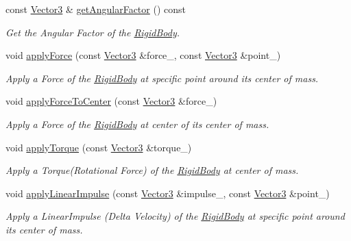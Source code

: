 \begin{DoxyCompactItemize}
const \hyperlink{class_i_dream_sky_1_1_vector3}{Vector3} \& \hyperlink{class_i_dream_sky_1_1_physics3_1_1_vehicle_a8a81aa89360fc21741a0c6d8f2e91150}{get\+Angular\+Factor} () const 
\begin{DoxyCompactList}\small\item\em Get the Angular Factor of the \hyperlink{class_i_dream_sky_1_1_physics3_1_1_rigid_body}{Rigid\+Body}. \end{DoxyCompactList}\item 
void \hyperlink{class_i_dream_sky_1_1_physics3_1_1_vehicle_a1360c062b6bbdf4a91166363ae96445f}{apply\+Force} (const \hyperlink{class_i_dream_sky_1_1_vector3}{Vector3} \&force\+\_\+, const \hyperlink{class_i_dream_sky_1_1_vector3}{Vector3} \&point\+\_\+)
\begin{DoxyCompactList}\small\item\em Apply a Force of the \hyperlink{class_i_dream_sky_1_1_physics3_1_1_rigid_body}{Rigid\+Body} at specific point around its center of mass. \end{DoxyCompactList}\item 
void \hyperlink{class_i_dream_sky_1_1_physics3_1_1_vehicle_ae80825e7abe28e2a69a5eda042c44d7c}{apply\+Force\+To\+Center} (const \hyperlink{class_i_dream_sky_1_1_vector3}{Vector3} \&force\+\_\+)
\begin{DoxyCompactList}\small\item\em Apply a Force of the \hyperlink{class_i_dream_sky_1_1_physics3_1_1_rigid_body}{Rigid\+Body} at center of its center of mass. \end{DoxyCompactList}\item 
void \hyperlink{class_i_dream_sky_1_1_physics3_1_1_vehicle_af050314c2a4f176c6b17b039fff24688}{apply\+Torque} (const \hyperlink{class_i_dream_sky_1_1_vector3}{Vector3} \&torque\+\_\+)
\begin{DoxyCompactList}\small\item\em Apply a Torque(\+Rotational Force) of the \hyperlink{class_i_dream_sky_1_1_physics3_1_1_rigid_body}{Rigid\+Body} at center of mass. \end{DoxyCompactList}\item 
void \hyperlink{class_i_dream_sky_1_1_physics3_1_1_vehicle_aa48b93f6ce5ffd969cdb023be73b48df}{apply\+Linear\+Impulse} (const \hyperlink{class_i_dream_sky_1_1_vector3}{Vector3} \&impulse\+\_\+, const \hyperlink{class_i_dream_sky_1_1_vector3}{Vector3} \&point\+\_\+)
\begin{DoxyCompactList}\small\item\em Apply a Linear\+Impulse (Delta Velocity) of the \hyperlink{class_i_dream_sky_1_1_physics3_1_1_rigid_body}{Rigid\+Body} at specific point around its center of mass. \end{DoxyCompactList}\item 

\end{DoxyCompactItemize}
